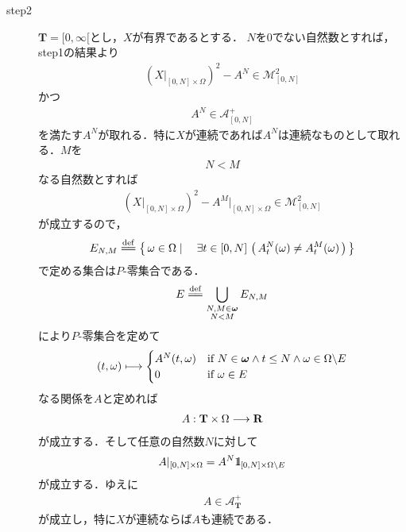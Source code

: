 \begin{sketch}
\begin{description}
			\item[step2]
				$\mathbf{T}=[0,\infty[$とし，$X$が有界であるとする．
				$N$を$0$でない自然数とすれば，step1の結果より
				\begin{align}
					\left(X|_{[0,N] \times \Omega}\right)^2 - A^N \in \mathscr{M}^2_{[0,N]}
				\end{align}
				かつ
				\begin{align}
					A^N \in \mathscr{A}^+_{[0,N]}
				\end{align}
				を満たす$A^N$が取れる．特に$X$が連続であれば$A^N$は連続なものとして取れる．$M$を
				\begin{align}
					N < M
				\end{align}
				なる自然数とすれば
				\begin{align}
					\left(X|_{[0,N] \times \Omega}\right)^2 - A^M|_{[0,N] \times \Omega} \in \mathscr{M}^2_{[0,N]}
				\end{align}
				が成立するので，
				\begin{align}
					E_{N,M} \defeq \Set{\omega \in \Omega}{\exists t \in [0,N]\,
					\left(\, A^N_t(\omega) \neq A^M_t(\omega)\, \right)}
				\end{align}
				で定める集合は$P$-零集合である．
				\begin{align}
					E \defeq \bigcup_{\substack{N,M \in \Natural \\ N < M}} E_{N,M}
				\end{align}
				により$P$-零集合を定めて
				\begin{align}
					(t,\omega) \longmapsto
					\begin{cases}
						A^N(t,\omega) & \mbox{if } N \in {\boldsymbol \omega} \wedge t \leq N \wedge \omega \in \Omega \backslash E \\
						0 & \mbox{if } \omega \in E
					\end{cases}	
				\end{align}
				なる関係を$A$と定めれば
				\begin{align}
					A:\mathbf{T} \times \Omega \longrightarrow \mathbf{R}
				\end{align}
				が成立する．そして任意の自然数$N$に対して
				\begin{align}
					A|_{[0,N] \times \Omega} = A^N \mbox{1}\hspace{-0.25em}\mbox{l}_{[0,N] \times \Omega \backslash E}
				\end{align}
				が成立する．ゆえに
				\begin{align}
					A \in \mathscr{A}^+_{\mathbf{T}}
				\end{align}
				が成立し，特に$X$が連続ならば$A$も連続である．

\end{description}
\end{sketch}
